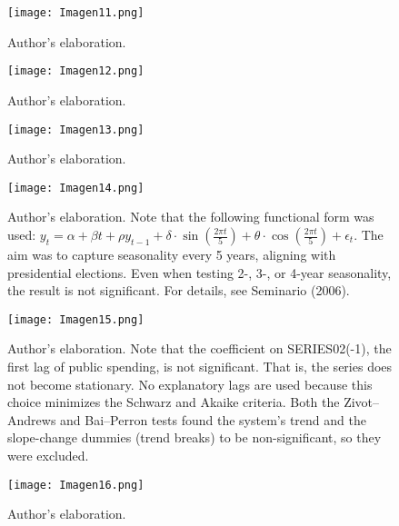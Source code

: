 \documentclass[12pt]{article}
\begin{document}
\begin{figure}[H]
\par\vspace{0.8em}
\texttt{[image: Imagen11.png]}

{\footnotesize Author’s elaboration.}
\end{figure}

\begin{figure}[H]
\par\vspace{0.8em}
\texttt{[image: Imagen12.png]}

{\footnotesize Author’s elaboration.}
\end{figure}

\begin{figure}[H]
\par\vspace{0.8em}
\texttt{[image: Imagen13.png]}

{\footnotesize Author’s elaboration.}
\end{figure}

\begin{figure}[H]
\par\vspace{0.8em}
\texttt{[image: Imagen14.png]}

{\footnotesize Author’s elaboration. Note that the following functional form was used:
$y_t=\alpha+\beta t+\rho y_{t-1}+\delta\cdot\sin\!\left(\frac{2\pi t}{5}\right)+\theta\cdot\cos\!\left(\frac{2\pi t}{5}\right)+\epsilon_t$. The aim was to capture seasonality every 5 years, aligning with presidential elections. Even when testing 2-, 3-, or 4-year seasonality, the result is not significant. For details, see Seminario (2006).}
\end{figure}

\begin{figure}[H]
\par\vspace{0.8em}
\texttt{[image: Imagen15.png]}

{\footnotesize Author’s elaboration. Note that the coefficient on SERIES02(-1), the first lag of public spending, is not significant. That is, the series does not become stationary. No explanatory lags are used because this choice minimizes the Schwarz and Akaike criteria. Both the Zivot–Andrews and Bai–Perron tests found the system’s trend and the slope-change dummies (trend breaks) to be non-significant, so they were excluded.}
\end{figure}

\begin{figure}[H]
\par\vspace{0.8em}
\texttt{[image: Imagen16.png]}

{\footnotesize Author’s elaboration.}
\end{figure}
\end{document}
